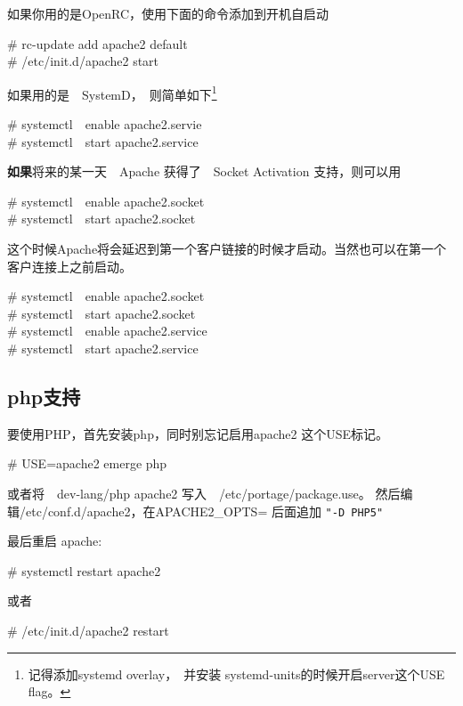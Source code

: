 如果你用的是OpenRC，使用下面的命令添加到开机自启动

\begin{code}
\# rc-update add apache2 default\\
\# /etc/init.d/apache2 start
\end{code}

如果用的是　SystemD，　则简单如下\footnote{记得添加systemd overlay，　并安装 systemd-units的时候开启server这个USE flag。}

\begin{code}
\# systemctl　enable apache2.servie\\
\# systemctl　start apache2.service
\end{code}

\textbf{如果}将来的某一天　Apache 获得了　Socket Activation 支持，则可以用

\begin{code}
\# systemctl　enable apache2.socket\\
\# systemctl　start apache2.socket
\end{code}

这个时候Apache将会延迟到第一个客户链接的时候才启动。当然也可以在第一个客户连接上之前启动。

\begin{code}
\# systemctl　enable apache2.socket\\
\# systemctl　start apache2.socket\\
\# systemctl　enable apache2.service\\
\# systemctl　start apache2.service
\end{code}

\subsection{php支持}

要使用PHP，首先安装php，同时别忘记启用apache2 这个USE标记。

\begin{code}
\# USE=apache2 emerge php
\end{code}

或者将　dev-lang/php apache2 写入　/etc/portage/package.use。
然后编辑/etc/conf.d/apache2，在APACHE2\_OPTS= 后面追加 \texttt{"-D PHP5"}

最后重启 apache:

\begin{code}
\# systemctl restart apache2

或者

\# /etc/init.d/apache2 restart

\end{code}

